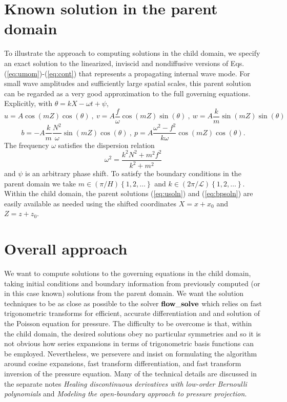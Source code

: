 \documentclass{jfm-like}
\begin{document}
\section{Known solution in the parent domain}
To illustrate the approach to computing solutions in the child domain, we specify an exact solution to the linearized, inviscid and nondiffusive versions of Eqs. (\ref{eq:umom})-(\ref{eq:cont}) that represents a propagating internal wave mode.
For small wave amplitudes and sufficiently large spatial scales, this parent solution can be regarded as a very good approximation to the full governing equations. Explicitly, with $\theta = kX - \omega t + \psi$,
\begin{equation}
u = A \cos(mZ) \cos(\theta) ~,~ v = A \frac{f}{\omega} \cos(mZ) \sin(\theta) ~,~ w = A \frac{k}{m} \sin(mZ) \sin(\theta)
\label{eq:usoln}
\end{equation}
\begin{equation}
 b = -A  \frac{k}{m} \frac{N^2}{\omega} \sin(mZ) \cos(\theta) ~,~ p = A \frac{\omega^2-f^2}{k \omega} \cos(mZ) \cos(\theta).
\label{eq:bpsoln}
\end{equation}
The frequency $\omega$ satisfies the dispersion relation
\begin{equation}
\omega^2 = \frac{k^2 N^2 + m^2 f^2}{k^2 + m^2}
\end{equation}
and $\psi$ is an arbitrary phase shift.
To satisfy the boundary conditions in the parent domain we take $m \in (\pi/H) \left\{ 1,2, \dots \right\}$ and  $k \in (2\pi/{\mathcal L}) \left\{ 1,2, \dots \right\}$.
Within the child domain, the parent solutions (\ref{eq:usoln}) and (\ref{eq:bpsoln})  are easily available as needed using the shifted coordinates $X=x + x_0$ and $Z=z + z_0$.


\section{Overall approach}
We want to compute solutions to the governing equations in the child domain, taking initial conditions and boundary information from previously computed (or in this case known) solutions
from the parent domain. We want the solution techniques to be as close as possible to the solver ${\bf flow\_solve}$ which relies on fast trigonometric transforms for efficient, accurate differentiation and
and solution of the Poisson equation for pressure. The difficulty to be overcome is that, within the child domain, the desired solutions obey no particular symmetries and so it is not obvious
how series expansions in terms of trigonometric basis functions can be employed. Nevertheless, we persevere and insist on formulating the algorithm around cosine expansions, fast transform differentiation,
and fast transform inversion of the pressure equation. Many of the technical details are discussed  in the separate notes {\em Healing discontinuous derivatives with low-order Bernoulli polynomials}
and {\em Modeling the open-boundary approach to pressure projection}.
\end{document}
